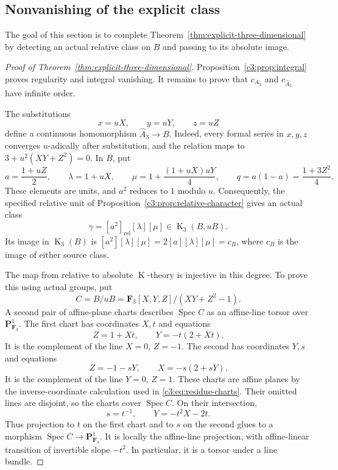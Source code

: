 \documentclass[11pt,a4paper]{amsart}
\numberwithin{equation}{section}
\theoremstyle{definition}
\theoremstyle{remark}
\newcommand{\CthreeF}{\mathbf{F}}
\newcommand{\CthreePP}{\mathbf{P}}
\newcommand{\Cthreerel}{\mathrm{rel}}
\DeclareMathOperator{\CthreeK}{K}
\DeclareMathOperator{\CthreeSpec}{Spec}
\begin{document}
\subsection{Nonvanishing of the explicit class}\label{c3:sec:nonvanishing}

The goal of this section is to complete
Theorem~\ref{thm:explicit-three-dimensional} by detecting an actual
relative class on $B$ and passing to its absolute image.

\begin{proof}[Proof of Theorem~\ref{thm:explicit-three-dimensional}]
Proposition~\ref{c3:prop:integral} proves regularity and integral
vanishing.
It remains to prove that $c_{A_3}$ and $c_{\widehat A_3}$ have infinite
order.

The substitutions
\[
 x=uX,\qquad y=uY,\qquad z=uZ
\]
define a continuous homomorphism $\widehat A_3\to B$.
Indeed, every formal series in $x,y,z$ converges $u$-adically after
substitution, and the relation maps to
$3+u^2(XY+Z^2)=0$.
In $B$, put
\[
 a=\frac{1+uZ}{2},\qquad
 \lambda=1+uX,\qquad
 \mu=1+\frac{(1+uX)uY}{4},\qquad
 q=a(1-a)=\frac{1+3Z^2}{4}.
\]
These elements are units, and $a^2$ reduces to $1$ modulo $u$.
Consequently, the specified relative unit of
Proposition~\ref{c3:prop:relative-character} gives an actual class
\begin{equation}\label{c3:eq:relative-class}
 \gamma=[a^2]_{\Cthreerel}[\lambda][\mu]\in\CthreeK_3(B,uB).
\end{equation}
Its image in $\CthreeK_3(B)$ is
$[a^2][\lambda][\mu]=2[a][\lambda][\mu]=c_B$,
where $c_B$ is the image of either source class.

The map from relative to absolute $\CthreeK$-theory is injective in this
degree. To prove this using actual groups, put
\[
 C=B/uB=\CthreeF_3[X,Y,Z]/(XY+Z^2-1).
\]
A second pair of affine-plane charts describes $\CthreeSpec C$ as an
affine-line torsor over $\CthreePP^1_{\CthreeF_3}$.
The first chart has coordinates $X,t$ and equations
\[
 Z=1+Xt,\qquad Y=-t(2+Xt).
\]
It is the complement of the line $X=0$, $Z=-1$.
The second has coordinates $Y,s$ and equations
\[
 Z=-1-sY,\qquad X=-s(2+sY).
\]
It is the complement of the line $Y=0$, $Z=1$.
These charts are affine planes by the inverse-coordinate calculation
used in \eqref{c3:eq:residue-charts}.
Their omitted lines are disjoint, so the charts cover $\CthreeSpec C$.
On their intersection,
\begin{equation}\label{c3:eq:affine-line-transition}
 s=t^{-1},\qquad Y=-t^2X-2t.
\end{equation}
Thus projection to $t$ on the first chart and to $s$ on the second
glues to a morphism $\CthreeSpec C\to\CthreePP^1_{\CthreeF_3}$.
It is locally the affine-line projection, with affine-linear
transition of invertible slope $-t^2$.
In particular, it is a torsor under a line bundle.


\end{proof}
\end{document}
